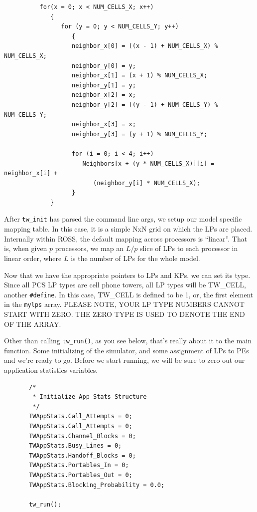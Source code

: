 \documentclass[12pt]{article}
\begin{document}
\begin{verbatim}
          for(x = 0; x < NUM_CELLS_X; x++)
             {
                for (y = 0; y < NUM_CELLS_Y; y++)
                   {
                   neighbor_x[0] = ((x - 1) + NUM_CELLS_X) % NUM_CELLS_X;
                   neighbor_y[0] = y;
                   neighbor_x[1] = (x + 1) % NUM_CELLS_X;
                   neighbor_y[1] = y;
                   neighbor_x[2] = x;
                   neighbor_y[2] = ((y - 1) + NUM_CELLS_Y) % NUM_CELLS_Y;
                   neighbor_x[3] = x;
                   neighbor_y[3] = (y + 1) % NUM_CELLS_Y;

                   for (i = 0; i < 4; i++)
                      Neighbors[x + (y * NUM_CELLS_X)][i] = neighbor_x[i] +
                         (neighbor_y[i] * NUM_CELLS_X);
                   }
             }
\end{verbatim}

After {\tt tw\_init} has parsed the command line args, we setup our model
specific mapping table. In this case, it is a simple NxN grid on which the LPs
are placed. Internally within ROSS, the default mapping across processors is
``linear''. That is, when given $p$ processors, we map an $L/p$ slice of LPs to
each processor in linear order, where $L$ is the number of LPs for the whole
model.

Now that we have the appropriate pointers to LPs and KPs, we can set its
type.  Since all PCS LP types are cell phone towers, all LP types will be
TW\_CELL, another {\tt\#define}. In this case, TW\_CELL is defined to be 1, or,
the first element in the {\tt mylps} array. PLEASE NOTE, YOUR LP TYPE NUMBERS
CANNOT
START WITH ZERO. THE ZERO TYPE IS USED TO DENOTE THE END OF THE ARRAY.

Other than calling {\tt tw\_run()}, as you see below, that's really about it
to the main function.  Some initializing of the simulator, and some assignment
of LPs to PEs and we're ready to go.  Before we start running, we will be sure
to zero out our application statistics variables.

\begin{verbatim}
       /*
        * Initialize App Stats Structure
        */
       TWAppStats.Call_Attempts = 0;
       TWAppStats.Call_Attempts = 0;
       TWAppStats.Channel_Blocks = 0;
       TWAppStats.Busy_Lines = 0;
       TWAppStats.Handoff_Blocks = 0;
       TWAppStats.Portables_In = 0;
       TWAppStats.Portables_Out = 0;
       TWAppStats.Blocking_Probability = 0.0;

       tw_run();
\end{verbatim}
      
\end{document}
